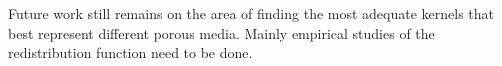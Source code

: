 \documentclass{CFD2011}
\newcommand{\TODO}[1]{\textcolor{blue}{TODO: #1} \\}
\newcommand{\Fede}[1]{\textcolor{green}{Fede: #1} \\}
\begin{document}
Future work still remains on the area of finding the most adequate kernels that best represent different porous media. Mainly empirical studies of the redistribution function need to be done.
%
%
%
%
%
%
%
%
%
%
%
%
\end{document}
